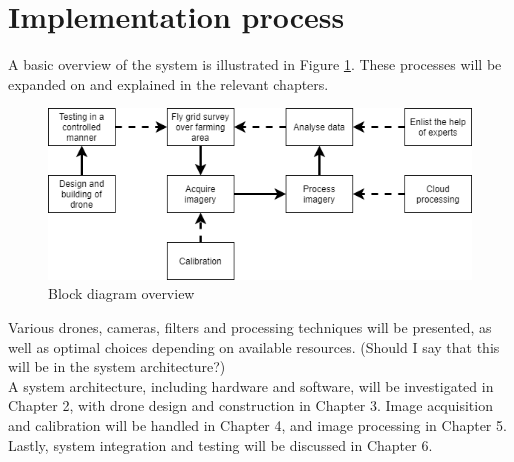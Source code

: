 \section{Implementation process}

A basic overview of the system is illustrated in Figure \ref{fig:overview}. These processes will be expanded on and explained in the relevant chapters.

\begin{figure}[H]
\centering
\includegraphics[scale=0.6]{images/thesis_overview.png}
\caption{Block diagram overview}
\label{fig:overview}
\end{figure}

\noindent
Various drones, cameras, filters and processing techniques will be presented, as well as optimal choices depending on available resources. (Should I say that this will be in the system architecture?)\\

\noindent
A system architecture, including hardware and software, will be investigated in Chapter 2, with drone design and construction in Chapter 3. Image acquisition and calibration will be handled in Chapter 4, and image processing in Chapter 5. Lastly, system integration and testing will be discussed in Chapter 6.